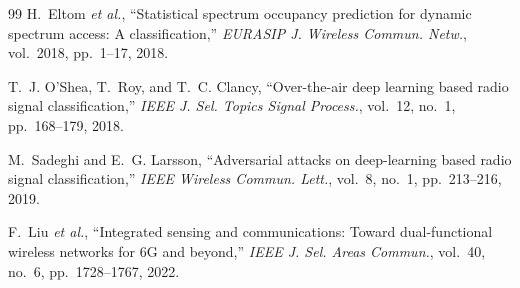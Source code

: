 \documentclass[lettersize,journal]{IEEEtran}
\begin{document}
\begin{thebibliography}{99}
 H.~Eltom \emph{et al.}, ``Statistical spectrum occupancy prediction for dynamic spectrum access: A classification,'' \emph{EURASIP J. Wireless Commun. Netw.}, vol.~2018, pp.~1--17, 2018.

 T.~J. O'Shea, T.~Roy, and T.~C. Clancy, ``Over-the-air deep learning based radio signal classification,'' \emph{IEEE J. Sel. Topics Signal Process.}, vol.~12, no.~1, pp.~168--179, 2018.

 M.~Sadeghi and E.~G. Larsson, ``Adversarial attacks on deep-learning based radio signal classification,'' \emph{IEEE Wireless Commun. Lett.}, vol.~8, no.~1, pp.~213--216, 2019.

 F.~Liu \emph{et al.}, ``Integrated sensing and communications: Toward dual-functional wireless networks for 6G and beyond,'' \emph{IEEE J. Sel. Areas Commun.}, vol.~40, no.~6, pp.~1728--1767, 2022.

\end{thebibliography}

\vfill
\end{document}
